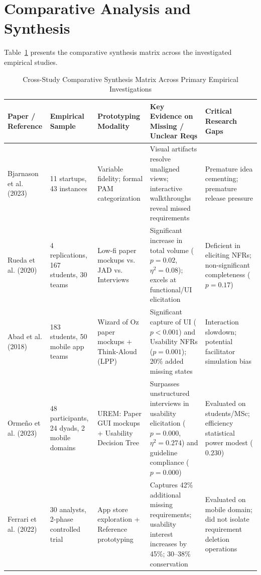 \documentclass[conference]{IEEEtran}
\begin{document}
\section{Comparative Analysis and Synthesis}
Table~\ref{tab:synthesis_matrix} presents the comparative synthesis matrix across the investigated empirical studies.

\begin{table}[t]
\caption{Cross-Study Comparative Synthesis Matrix Across Primary Empirical Investigations}
\label{tab:synthesis_matrix}
\centering
\begin{tabular}{@{}p{3.0cm}p{2.6cm}p{3.2cm}p{4.6cm}p{3.0cm}@{}}
\toprule
\textbf{Paper / Reference} & \textbf{Empirical Sample} & \textbf{Prototyping Modality} & \textbf{Key Evidence on Missing / Unclear Reqs} & \textbf{Critical Research Gaps} \\ \midrule
Bjarnason et al. (2023)~\cite{bjarnason2023empirically} & 11 startups, 43 instances & Variable fidelity; formal PAM categorization & Visual artifacts resolve unaligned views; interactive walkthroughs reveal missed requirements & Premature idea cementing; premature release pressure \\ \addlinespace
Rueda et al. (2020)~\cite{rueda2020requirements} & 4 replications, 167 students, 30 teams & Low-fi paper mockups vs. JAD vs. Interviews & Significant increase in total volume ($p = 0.02$, $\eta^2 = 0.08$); excels at functional/UI elicitation & Deficient in eliciting NFRs; non-significant completeness ($p = 0.17$) \\ \addlinespace
Abad et al. (2018)~\cite{abad2018loud} & 183 students, 50 mobile app teams & Wizard of Oz paper mockups + Think-Aloud (LPP) & Significant capture of UI ($p < 0.001$) and Usability NFRs ($p = 0.001$); 20\% added missing states & Interaction slowdown; potential facilitator simulation bias \\ \addlinespace
Orme{\~n}o et al. (2023)~\cite{uv2023empirical} & 48 participants, 24 dyads, 2 mobile domains & UREM: Paper GUI mockups + Usability Decision Tree & Surpasses unstructured interviews in usability elicitation ($p = 0.000$, $\eta^2 = 0.274$) and guideline compliance ($p = 0.000$) & Evaluated on students/MSc; efficiency statistical power modest ($0.230$) \\ \addlinespace
Ferrari et al. (2022)~\cite{rej2022evolve} & 30 analysts, 2-phase controlled trial & App store exploration + Reference prototyping & Captures 42\% additional missing requirements; usability interest increases by 45\%; 30--38\% conservation & Evaluated on mobile domain; did not isolate requirement deletion operations \\ \bottomrule
\end{tabular}
\end{table}
\end{document}
